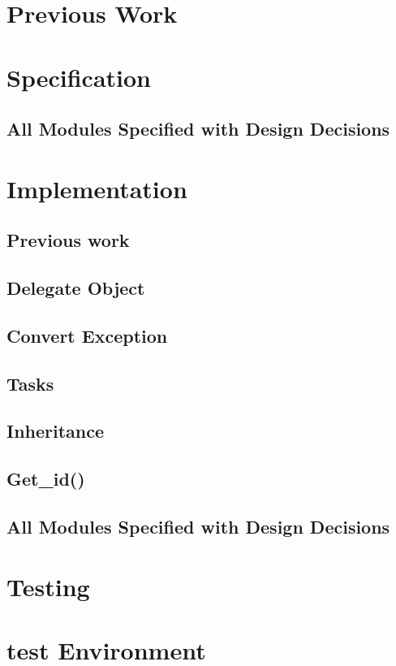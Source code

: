 \documentclass[a4paper,11pt,onecolumn,notitlepage]{report}
\begin{document}
\section{Previous Work}
\pagebreak[0]

\section{Specification}
\subsection{All Modules Specified with Design Decisions}
\pagebreak[0]

\section{Implementation}
\subsection{Previous work}
\subsection{Delegate Object}
\subsection{Convert Exception}
\subsection{Tasks}
\subsection{Inheritance}
\subsection{ Get\_id()}
\subsection{All Modules Specified with Design Decisions}
\pagebreak[0]


\section{Testing}
\section{test Environment}
\end{document}
